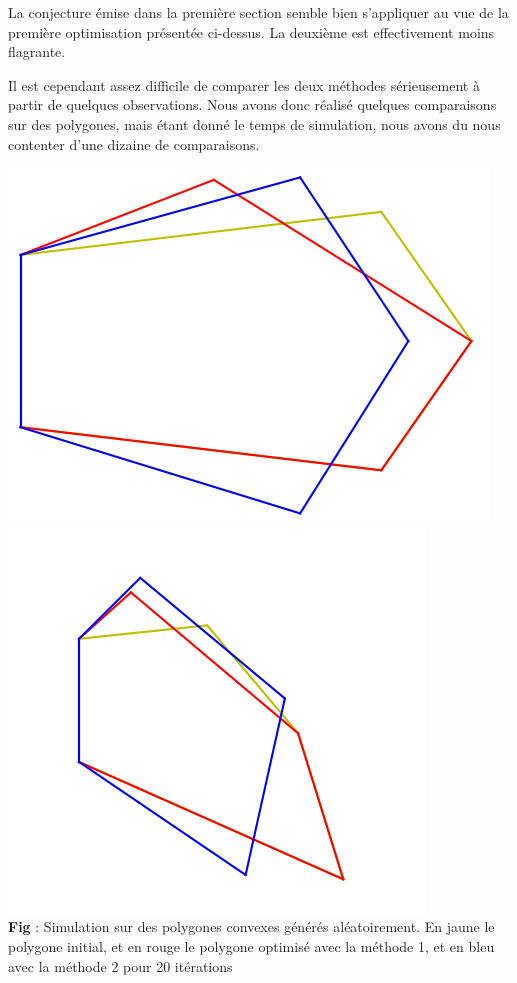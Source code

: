 \documentclass[a4paper,reqno]{article}
\begin{document}
\vspace{2cm}

\par La conjecture émise dans la première section semble bien s'appliquer au vue de la première optimisation présentée ci-dessus. La deuxième est effectivement moins flagrante. \\ 

\par Il est cependant assez difficile de comparer les deux méthodes sérieusement à partir de quelques observations. Nous avons donc réalisé quelques comparaisons sur des polygones, mais étant donné le temps de simulation, nous avons du nous contenter d'une dizaine de comparaisons. \\

\newpage
\begin{center}
	\includegraphics[scale=0.4]{comp1.png}\\
	\includegraphics[scale=0.45]{comparaison3.png}\\
	\textbf{Fig} : Simulation sur des polygones convexes générés aléatoirement. En jaune le polygone initial, et en rouge le polygone optimisé avec la méthode 1, et en bleu avec la méthode 2 pour 20 itérations
\end{center}
\end{document}
